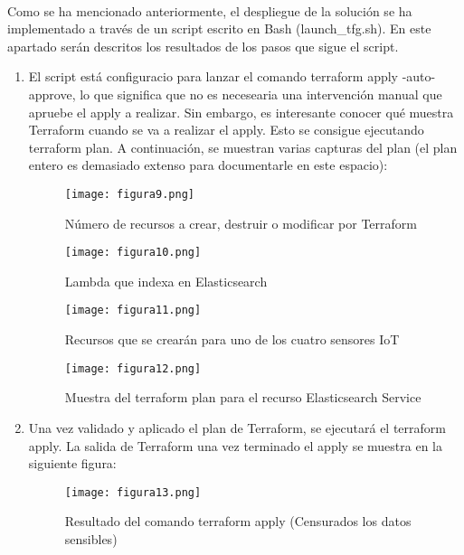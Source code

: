 \documentclass[../../memoria.tex]{subfiles}
\begin{document}
\paragraph{}
Como se ha mencionado anteriormente, el despliegue de la solución se ha implementado a través de un script escrito en Bash (launch\_tfg.sh). En este apartado serán descritos los resultados de los pasos que sigue el script.

\begin{enumerate}
    \item El script está configuracio para lanzar el comando terraform apply -auto-approve, lo que significa que no es necesearia una intervención manual que apruebe el apply a realizar. Sin embargo, es interesante conocer qué muestra Terraform cuando se va a realizar el apply. Esto se consigue ejecutando terraform plan. A continuación, se muestran varias capturas del plan (el plan entero es demasiado extenso para documentarle en este espacio):
          \begin{figure}[H]
              \centering
              \texttt{[image: figura9.png]}
              \caption{Número de recursos a crear, destruir o modificar por Terraform}
              \label{fig:figura9}
          \end{figure}
          \begin{figure}[H]
              \centering
              \texttt{[image: figura10.png]}
              \caption{Lambda que indexa en Elasticsearch}
              \label{fig:figura10}
          \end{figure}
          \begin{figure}[H]
              \centering
              \texttt{[image: figura11.png]}
              \caption{Recursos que se crearán para uno de los cuatro sensores IoT}
              \label{fig:figura11}
          \end{figure}
          \begin{figure}[H]
              \centering
              \texttt{[image: figura12.png]}
              \caption{Muestra del terraform plan para el recurso Elasticsearch Service}
              \label{fig:figura12}
          \end{figure}

    \item Una vez validado y aplicado el plan de Terraform, se ejecutará el terraform apply. La salida de Terraform una vez terminado el apply se muestra en la siguiente figura:
          \begin{figure}[H]
              \centering
              \texttt{[image: figura13.png]}
              \caption{Resultado del comando terraform apply (Censurados los datos sensibles)}
              \label{fig:figura13}
          \end{figure}



\end{enumerate}
\end{document}
